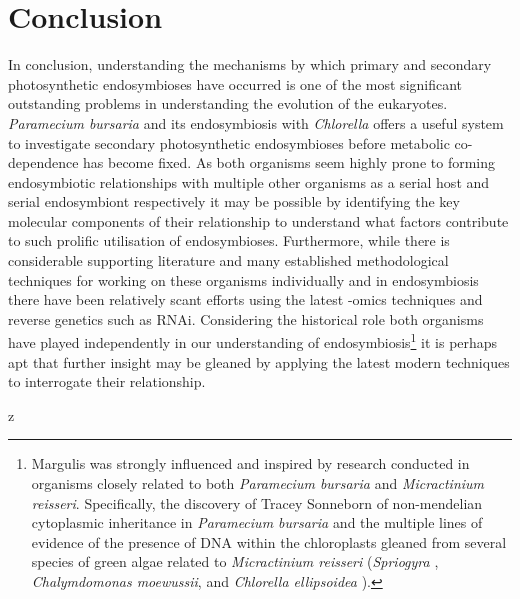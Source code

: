 \section{Conclusion}
In conclusion, understanding the mechanisms by which primary and secondary photosynthetic endosymbioses have occurred is one of the most significant
outstanding problems in understanding the evolution of the eukaryotes. \textit{Paramecium bursaria} and its endosymbiosis with \textit{Chlorella}
offers a useful system to investigate secondary photosynthetic endosymbioses before metabolic co-dependence has become fixed.  
As both organisms seem highly prone to forming endosymbiotic relationships with multiple other organisms as a serial host and serial endosymbiont
respectively it may be possible by identifying the key molecular components of their relationship to understand what factors contribute to such
prolific utilisation of endosymbioses.  Furthermore, while there is considerable supporting literature and many established methodological techniques
for working on these organisms individually and in endosymbiosis there have been relatively scant efforts using the latest -omics techniques 
and reverse genetics such as RNAi.
Considering the historical role both organisms have played independently in our understanding of endosymbiosis\footnote{Margulis was 
    strongly influenced and inspired by research conducted
in organisms closely related to both \textit{Paramecium bursaria} and 
\textit{Micractinium reisseri}. Specifically, the discovery of Tracey Sonneborn
of non-mendelian cytoplasmic inheritance in \textit{Paramecium bursaria} \citep{Sonneborn1950}
and the multiple lines of evidence of the presence of DNA within the chloroplasts
gleaned from several species of green algae related to \textit{Micractinium reisseri}
(\textit{Spriogyra} \citep{Stocking1959}, \textit{Chalymdomonas moewussii}, and 
\textit{Chlorella ellipsoidea} \cite{Ris1962}).} it is perhaps apt that further insight may be gleaned by applying the latest modern 
techniques to interrogate their relationship.

z
